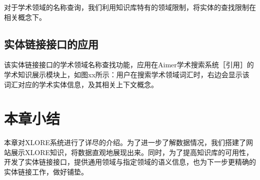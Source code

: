 对于学术领域的名称查询，我们利用知识库特有的领域限制，将实体的查找限制在相关概念下。

\subsection{实体链接接口的应用}
该实体链接接口的学术领域名称查找功能，应用在Aimer学术搜索系统［引用］的学术知识展示模块上，如图xx所示：用户在搜索学术领域词汇时，右边会显示该词汇对应的学术实体信息，及其相关上下文概念。

\section{本章小结}
本章对XLORE系统进行了详尽的介绍。为了进一步了解数据情况，我们搭建了网站展示XLORE知识，将数据直观地展现出来。同时，为了提高知识库的可用性，开发了实体链接接口，提供通用领域与指定领域的语义信息，也为下一步更精确的实体链接工作，做好铺垫。







